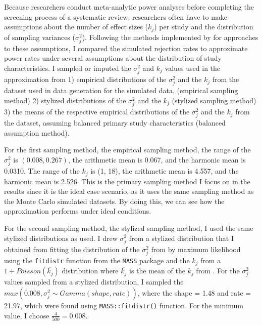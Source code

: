 Because researchers conduct meta-analytic power analyses before completing the screening process of a systematic review, researchers often have to make assumptions about the number of effect sizes ($k_j$) per study and the distribution of sampling variances ($\sigma_j^2$). Following the methods implemented by \textcite{vembye2023} for approaches to these assumptions, I compared the simulated rejection rates to approximate power rates under several assumptions about the distribution of study characteristics. I sampled or imputed the $\sigma_j^2$ and $k_j$ values used in the approximation from 1) empirical distributions of the $\sigma_j^2$ and the $k_j$ from the dataset used in data generation for the simulated data, \textcite{WilliamsRyan2022HiMI} (empirical sampling method) 2) stylized distributions of the $\sigma_j^2$ and the $k_j$ (stylized sampling method) 3) the means of the respective empirical distributions of the $\sigma_j^2$ and the $k_j$ from the \textcite{WilliamsRyan2022HiMI} dataset, assuming balanced primary study characteristics (balanced assumption method). 

For the first sampling method, the empirical sampling method, the range of the $\sigma_j^2$ is $(0.008, 0.267)$, the arithmetic mean is 0.067, and the harmonic mean is 0.0310. The range of the $k_j$ is (1, 18), the arithmetic mean is 4.557, and the harmonic mean is 2.526. This is the primary sampling method I focus on in the results since it is the ideal case scenario, as it uses the same sampling method as the Monte Carlo simulated datasets. By doing this, we can see how the approximation performs under ideal conditions.

For the second sampling method, the stylized sampling method, I used the same stylized distributions as \textcite{vembye2023} used. I drew $\sigma^2_j$ from a stylized distribution that I obtained from fitting the distribution of the $\sigma^2_j$ from \textcite{WilliamsRyan2022HiMI} by maximum likelihood using the  \texttt{fitdistr} function from the \texttt{MASS} package \autocite{venables2003} and the $k_j$ from a $1 + Poisson(\overline{k_j})$ distribution where $\overline{k_j}$ is the mean of the $k_j$ from \textcite{WilliamsRyan2022HiMI}. For the $\sigma_j^2$ values sampled from a stylized distribution, I sampled the $max(0.008,\sigma_j^2 \sim Gamma(shape, rate))$, where the shape = 1.48 and rate = 21.97, which were found using \texttt{MASS::fitdistr()} function. For the minimum value, I choose $\frac{4}{500}=0.008$. 


